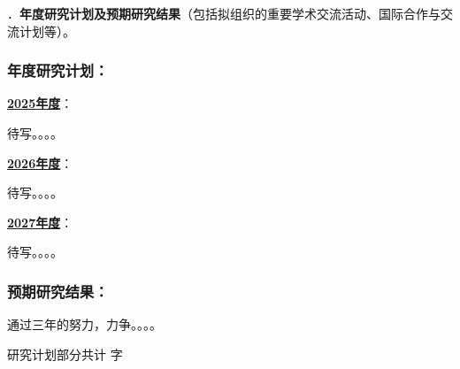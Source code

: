{\sihao \color{MsBlue} ．{\bfseries 年度研究计划及预期研究结果}（包括拟组织的重要学术交流活动、国际合作与交流计划等）。}

\subsubsection{{\bfseries 年度研究计划：}}

\uline{\bfseries 2025年度}：

待写。。。。

\uline{\bfseries 2026年度}：

待写。。。。

\uline{\bfseries 2027年度}：

待写。。。。


\subsubsection{{\bfseries 预期研究结果：}}

通过三年的努力，力争。。。。


\ifhandout
\else
\begin{center}
{\larger[2]\color{red}  研究计划部分共计 \wordcount 字 }
\end{center}
\fi


\vskip 5mm
